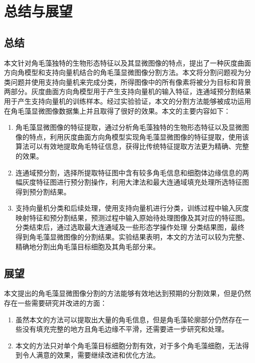 
\chapter{总结与展望}

\section{总结}
本文针对角毛藻独特的生物形态特征以及其显微图像的特点，提出了一种灰度曲面方向角模型和支持向量机结合的角毛藻显微图像分割方法。本文将分割问题视为分类问题并使用支持向量机来完成分类，所得图像中的所有像素将被分为目标和背景两部分。灰度曲面方向角模型用于产生支持向量机的输入特征，连通域预分割结果用于产生支持向量机的训练样本。经过实验验证，本文的分割方法能够被成功运用在角毛藻显微图像数据集上并且取得了很好的效果。本文的主要内容如下：
\begin{enumerate}
\item 角毛藻显微图像的特征提取，通过分析角毛藻独特的生物形态特征以及显微图像的特点，利用灰度曲面方向角模型实现角毛藻显微图像的特征提取，使用该算法可以有效地提取角毛特征信息，获得比传统特征提取方法更为精确、完整的效果。
\item 连通域预分割，选择所提取特征图中含有较多角毛信息和细胞体边缘信息的两幅灰度特征图进行预分割操作，利用大津法和最大连通域填充处理所选特征图得到预分割结果。
\item 支持向量机分类和后续处理，使用支持向量机进行分类，训练过程中输入灰度映射特征和预分割结果，预测过程中输入原始待处理图像及其对应的特征图。分类结束后，通过选取最大连通域及一些形态学操作处理
分类结果图，最终得到角毛藻显微图像的分割结果。实验结果表明，本文的方法可以较为完整、精确地分割出角毛藻目标细胞及其角毛部分来。
\end{enumerate}
\section{展望}
本文提出的角毛藻显微图像分割的方法能够有效地达到预期的分割效果，但是仍然存在一些需要研究并改进的方面：
\begin{enumerate}
\item 虽然本文的方法可以提取出大量的角毛信息，但是角毛藻轮廓部分仍然存在一些没有填充完整的地方且角毛边缘不平滑，还需要进一步研究和处理。
\item 本文的方法只对单个角毛藻目标细胞分割有效，对于多个角毛藻细胞，无法得到令人满意的效果，需要继续改进和优化方法。
\end{enumerate}
